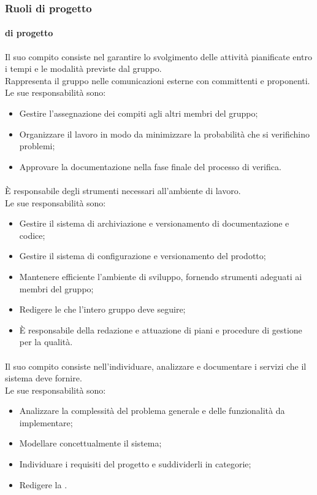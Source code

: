 \subsubsection{Ruoli di progetto}
\paragraph{\roleProjectManager{} di progetto}
Il suo compito consiste nel garantire lo svolgimento delle attività pianificate entro i tempi e le modalità previste dal gruppo.\\
Rappresenta il gruppo nelle comunicazioni esterne con committenti e proponenti.\\
Le sue responsabilità sono:
\begin{itemize}
  \item Gestire l'assegnazione dei compiti agli altri membri del gruppo;
  \item Organizzare il lavoro in modo da minimizzare la probabilità che si verifichino problemi;
  \item Approvare la documentazione nella fase finale del processo di verifica.
\end{itemize}

\paragraph{\roleAdministrator{}}
È responsabile degli strumenti necessari all'ambiente di lavoro.\\
Le sue responsabilità sono:
\begin{itemize}
  \item Gestire il sistema di archiviazione e versionamento di documentazione e codice;
  \item Gestire il sistema di configurazione e versionamento del prodotto;
  \item Mantenere efficiente l'ambiente di sviluppo, fornendo strumenti adeguati ai membri del gruppo;
  \item Redigere le \docNameVersionNdP{} che l'intero gruppo deve seguire;
  \item È responsabile della redazione e attuazione di piani e procedure di gestione per la qualità.
\end{itemize}

\paragraph{\roleAnalyst}
Il suo compito consiste nell'individuare, analizzare e documentare i servizi che il sistema deve fornire.\\
Le sue responsabilità sono:
\begin{itemize}
  \item Analizzare la complessità del problema generale e delle funzionalità da implementare;
  \item Modellare concettualmente il sistema;
  \item Individuare i requisiti del progetto e suddividerli in categorie;
  \item Redigere la \docNameVersionAdR{}.
\end{itemize}

